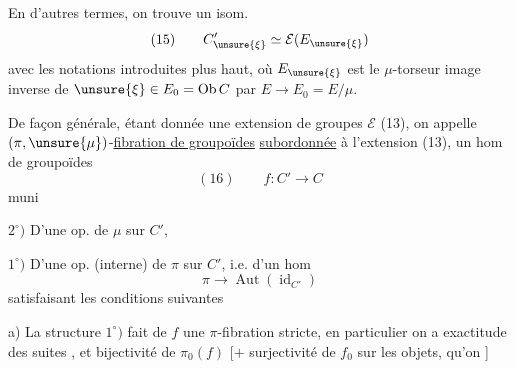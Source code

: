 En d'autres termes, on trouve un isom.
\[
(15)\qquad C'_{\unsure{\xi}}\simeq\mathcal E(E_{\unsure{\xi}})
\]
avec les notations introduites plus haut,
où $E_{\unsure{\xi}}$ est le $\mu$-torseur image inverse de
$\unsure{\xi}\in E_0=\operatorname{Ob}C$ par $E\longrightarrow E_0=E/\mu$.

De façon générale, étant donnée une
extension  de groupes  $\mathcal E$
(13), on appelle $(\pi,\unsure{\mu})$-\uline{fibration  de groupoïdes}
\uline{subordonnée} à l'extension (13), un
hom de groupoïdes
\[
(16)\qquad f:C'\longrightarrow C
\]
muni

$2^\circ)$ D'une op.  de $\mu$ sur $C'$,
 

$1^\circ)$ D'une op. (interne) de $\pi$ sur $C'$, i.e.
d'un hom
\[
\pi\longrightarrow\operatorname{Aut}(\operatorname{id}_{C'})
\]
satisfaisant les conditions suivantes

a) La structure $1^\circ)$ fait de $f$ une $\pi$-fibration
stricte, en particulier on a exactitude des suites
, et bijectivité de $\pi_0(f)$
[$+$ surjectivité de $f_0$
sur les objets, qu'on ]
